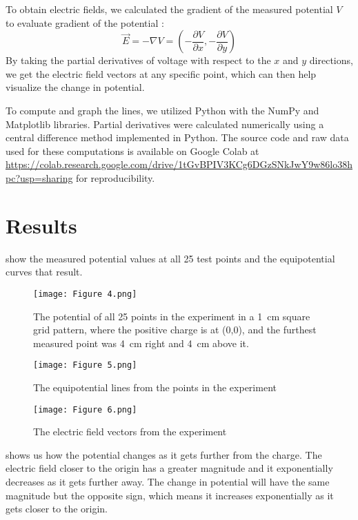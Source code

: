 \documentclass[10pt,journal,twoside]{IEEEtran}
\begin{document}
To obtain electric fields, we calculated the gradient of the measured potential $V$ to evaluate gradient of the potential \cite{tipler,stewart,cantt-2013-equipotential,fongsuwan-2019-system}:
\begin{equation}
\vec{E} = -\nabla V = \left( -\frac{\partial V}{\partial x}, -\frac{\partial V}{\partial y} \right)
\label{eq:1}
\end{equation}
By taking the partial derivatives of voltage with respect to the $x$ and $y$ directions, we get the electric field vectors at any specific point, which can then help visualize the change in potential.

To compute and graph the lines, we utilized Python with the NumPy \cite{harris2020array} and Matplotlib \cite{hunter:2007} libraries. Partial derivatives were calculated numerically using a central difference method implemented in Python. The source code and raw data used for these computations is available on Google Colab at \url{https://colab.research.google.com/drive/1tGvBPIV3KCg6DGzSNkJwY9w86lo38hpc?usp=sharing} for reproducibility.






\section{Results}
 show the measured potential values at all 25 test points and the equipotential curves that result. 
\begin{figure}
\begin{center}
\texttt{[image: Figure 4.png]}
\end{center}
\caption{The potential of all 25 points in the experiment in a \qty{1}{\centi\meter} square grid pattern, where the positive charge is at (0,0), and the furthest measured point was \qty{4}{\centi\meter} right and \qty{4}{\centi\meter} above it.}
\label{fig:4}
\end{figure}

\begin{figure}
\begin{center}
\texttt{[image: Figure 5.png]}
\end{center}
\caption{The equipotential lines from the points in the experiment}
\label{fig:5}
\end{figure}

\begin{figure}
\begin{center}
\texttt{[image: Figure 6.png]}
\end{center}    
\caption{The electric field vectors from the experiment}
\label{fig:6}
\end{figure}
 shows us how the potential changes as it gets further from the charge. The electric field closer to the origin has a greater magnitude and it exponentially decreases as it gets further away. The change in potential will have the same magnitude but the opposite sign, which means it increases exponentially as it gets closer to the origin.
\end{document}
